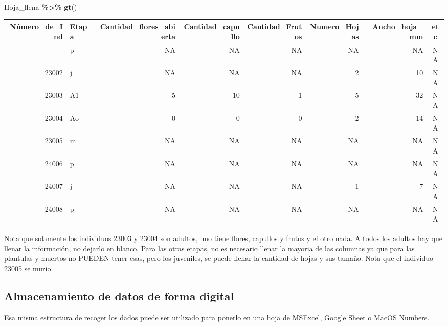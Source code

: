 \documentclass[
]{book}
\newenvironment{Shaded}{\begin{snugshade}}{\end{snugshade}}
\newcommand{\FunctionTok}[1]{\textcolor[rgb]{0.13,0.29,0.53}{\textbf{#1}}}
\newcommand{\NormalTok}[1]{#1}
\newcommand{\SpecialCharTok}[1]{\textcolor[rgb]{0.81,0.36,0.00}{\textbf{#1}}}
\theoremstyle{definition}
\theoremstyle{definition}
\theoremstyle{definition}
\theoremstyle{definition}
\theoremstyle{remark}
\begin{document}
\begin{Shaded}
\begin{Highlighting}[]
\NormalTok{Hoja\_llena }\SpecialCharTok{\%\textgreater{}\%} \FunctionTok{gt}\NormalTok{()}
\end{Highlighting}
\end{Shaded}

\begin{longtable}{rlrrrrrc}
\toprule
Número\_de\_Ind & Etapa & Cantidad\_flores\_abierta & Cantidad\_capullo & Cantidad\_Frutos & Numero\_Hojas & Ancho\_hoja\_mm & etc \\ 
\midrule\addlinespace[2.5pt]
23001 & p & NA & NA & NA & NA & NA & NA \\ 
23002 & j & NA & NA & NA & 2 & 10 & NA \\ 
23003 & A1 & 5 & 10 & 1 & 5 & 32 & NA \\ 
23004 & Ao & 0 & 0 & 0 & 2 & 14 & NA \\ 
23005 & m & NA & NA & NA & NA & NA & NA \\ 
24006 & p & NA & NA & NA & NA & NA & NA \\ 
24007 & j & NA & NA & NA & 1 & 7 & NA \\ 
24008 & p & NA & NA & NA & NA & NA & NA \\ 
\bottomrule
\end{longtable}

Nota que solamente los individuos 23003 y 23004 son adultos, uno tiene flores, capullos y frutos y el otro nada. A todos los adultos hay que llenar la información, no dejarlo en blanco. Para las otras etapas, no es necesario llenar la mayoria de las columnas ya que para las plantulas y muertos no PUEDEN tener esas, pero los juveniles, se puede llenar la cantidad de hojas y sus tamaño. Nota que el individuo 23005 se murio.

\subsection{Almacenamiento de datos de forma digital}\label{almacenamiento-de-datos-de-forma-digital}

Esa misma estructura de recoger los dados puede ser utilizado para ponerlo en una hoja de MSExcel, Google Sheet o MacOS Numbers.
\end{document}
